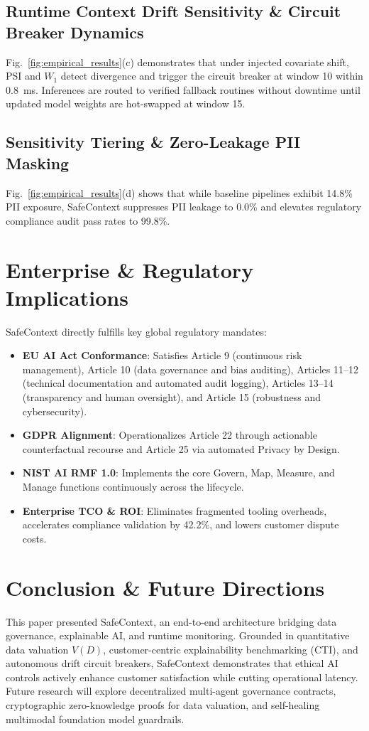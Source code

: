 \documentclass[journal]{IEEEtran}
\begin{document}
\subsection{Runtime Context Drift Sensitivity \& Circuit Breaker Dynamics}
Fig.~\ref{fig:empirical_results}(c) demonstrates that under injected covariate shift, PSI and $W_1$ detect divergence and trigger the circuit breaker at window 10 within 0.8~ms. Inferences are routed to verified fallback routines without downtime until updated model weights are hot-swapped at window 15.

\subsection{Sensitivity Tiering \& Zero-Leakage PII Masking}
Fig.~\ref{fig:empirical_results}(d) shows that while baseline pipelines exhibit 14.8\% PII exposure, SafeContext suppresses PII leakage to 0.0\% and elevates regulatory compliance audit pass rates to 99.8\%.

\section{Enterprise \& Regulatory Implications}
SafeContext directly fulfills key global regulatory mandates:
\begin{itemize}
    \item \textbf{EU AI Act Conformance}: Satisfies Article 9 (continuous risk management), Article 10 (data governance and bias auditing), Articles 11--12 (technical documentation and automated audit logging), Articles 13--14 (transparency and human oversight), and Article 15 (robustness and cybersecurity).
    \item \textbf{GDPR Alignment}: Operationalizes Article 22 through actionable counterfactual recourse and Article 25 via automated Privacy by Design.
    \item \textbf{NIST AI RMF 1.0}: Implements the core Govern, Map, Measure, and Manage functions continuously across the lifecycle.
    \item \textbf{Enterprise TCO \& ROI}: Eliminates fragmented tooling overheads, accelerates compliance validation by 42.2\%, and lowers customer dispute costs.
\end{itemize}

\section{Conclusion \& Future Directions}
This paper presented SafeContext, an end-to-end architecture bridging data governance, explainable AI, and runtime monitoring. Grounded in quantitative data valuation $V(D)$, customer-centric explainability benchmarking (CTI), and autonomous drift circuit breakers, SafeContext demonstrates that ethical AI controls actively enhance customer satisfaction while cutting operational latency. Future research will explore decentralized multi-agent governance contracts, cryptographic zero-knowledge proofs for data valuation, and self-healing multimodal foundation model guardrails.



\end{document}
